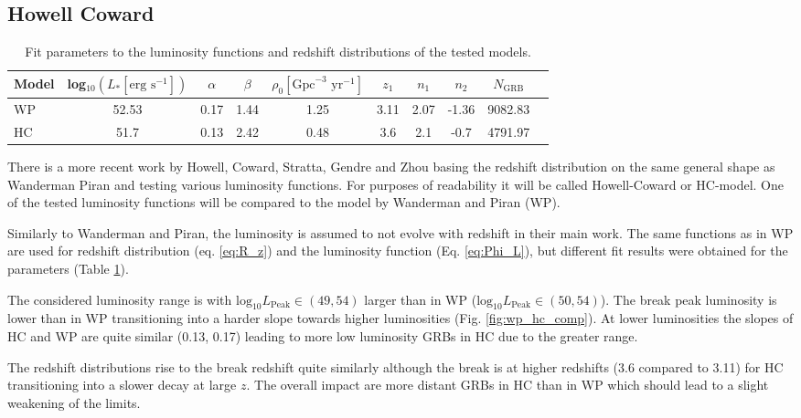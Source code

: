 \subsection{Howell Coward}
\begin{table}[h]
  \centering
  \begin{tabular}{l||c|c|c|c|c|c|c|c|c}
    Model & log$_{10}\left(L_* \left[ \text{erg} \text{ s}^{-1} \right] \right)$
& $\alpha$ & $\beta$ & $\rho_0 \left[\text{Gpc}^{-3} \text{ yr}^{-1} \right]$ &
$z_1$ & $n_1$ & $n_2$ & $N_\text{GRB}$ \\
    \hline
    WP & 52.53 & 0.17 & 1.44 & 1.25 & 3.11 & 2.07 & -1.36 & 9082.83\\
    HC & 51.7 & 0.13 & 2.42 & 0.48 & 3.6 & 2.1 & -0.7 & 4791.97\\
  \end{tabular}
  \caption{Fit parameters to the luminosity functions and redshift
distributions of the tested models.}
  \label{tab:grb_model_params}
\end{table}
There is a more recent work \cite{HC} by Howell, Coward, Stratta,
Gendre and Zhou basing the redshift distribution on
the same general shape as Wanderman Piran and testing various luminosity 
functions. For purposes of
readability it will be called Howell-Coward or HC-model. 
One of the tested luminosity functions
will be compared to the model by Wanderman and
Piran (WP). 

Similarly to Wanderman and Piran, the luminosity is assumed to not evolve
with redshift in their main work.
The same functions as in WP are used for redshift distribution (eq. 
\ref{eq:R_z}) and the
luminosity function (Eq. \ref{eq:Phi_L}), but different fit results
were obtained for the parameters (Table \ref{tab:grb_model_params}).

The considered luminosity range is with $\text{log}_{10} L_\text{Peak} \in
\left( 49, 54 \right)$ larger than in WP ($\text{log}_{10} L_\text{Peak} \in
\left( 50, 54 \right)$). The break peak luminosity is lower
than in WP transitioning into a harder slope towards higher luminosities (Fig.
\ref{fig:wp_hc_comp}). At lower luminosities the slopes of HC and WP are
quite similar (0.13, 0.17) leading to more low luminosity GRBs in HC due to the 
greater range.

The redshift distributions rise to the break redshift quite similarly although 
the break is at higher redshifts (3.6 compared to 3.11) for HC transitioning
into a slower decay at large $z$. The overall impact are more distant GRBs in
HC than in WP which should lead to a slight weakening of the limits.

